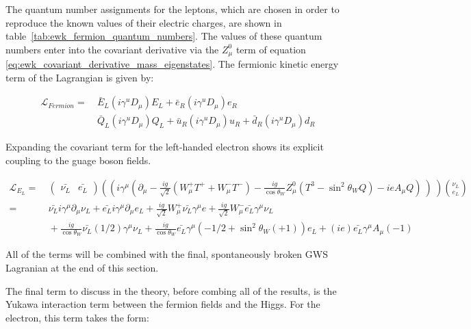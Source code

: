 \noindent The quantum number assignments for the leptons, which are
chosen in order to reproduce the known values of their electric
charges, are shown in table~\ref{tab:ewk_fermion_quantum_numbers}.
The values  of these quantum numbers enter into the covariant
derivative via the  $Z_{\mu}^{0}$ term of equation
\ref{eq:ewk_covariant_derivative_mass_eigenstates}.  The fermionic
kinetic energy term of the Lagrangian is given by:

\begin{equation}\label{eq:ewk_fermionic_lagrangian_term}
\begin{aligned}
\mathcal{L}_{Fermion} =&~ \bar{E}_{L}(i\gamma^{u}D_{\mu})E_{L} +
\bar{e}_{R}(i\gamma^{u}D_{\mu})e_{R} \\
&~ \bar{Q}_{L}(i\gamma^{u}D_{\mu})Q_{L} +
\bar{u}_{R}(i\gamma^{u}D_{\mu})u_{R} +
\bar{d}_{R}(i\gamma^{u}D_{\mu})d_{R}
\end{aligned}
\end{equation} 

\noindent Expanding the covariant term for the left-handed electron
shows its explicit coupling to the guage boson fields. 

\begin{equation}\label{eq:ewk_eLeft_lagrangian_term}
\begin{aligned}
\mathcal{L}_{E_{L}} =&~ 
\begin{pmatrix}
  \bar{\nu_{L}} & \bar{e_{L}} 
\end{pmatrix}
\left( (i\gamma^{\mu}(\partial_{\mu} -
  \frac{ig}{\sqrt{2}}(W_{\mu}^{+}T^{+} + W_{\mu}^{-}T^{-}) -
  \frac{ig}{\cos{\theta_{W}}}Z_{\mu}^{0}(T^{3}-\sin^{2}{\theta_{W}}Q)
  - ieA_{\mu}Q)~)~\right)\binom{\nu_{L}}{e_{L}} \\
=&~\bar{\nu_{L}}i\gamma^{\mu}\partial_{\mu}\nu_{L} +
\bar{e_{L}}i\gamma^{\mu}\partial_{\mu}e_{L}
+\frac{ig}{\sqrt{2}}W_{\mu}^{+}\bar{\nu_{L}}\gamma^{\mu}e +
\frac{ig}{\sqrt{2}}W_{\mu}^{-}\bar{e_{L}}\gamma^{\mu}\nu_{L} \\
&~+\frac{ig}{\cos{\theta_{W}}}\bar{\nu_{L}}(1/2)\gamma^{\mu}\nu_{L} +
\frac{ig}{\cos{\theta_{W}}}\bar{e_{L}}\gamma^{\mu}(-1/2 +
\sin^{2}{\theta_{W}}(+1))e_{L} + (ie)\bar{e_{L}}\gamma^{\mu}A_{\mu}(-1)
\end{aligned}
\end{equation}

\noindent All of the terms will be combined with the final,
spontaneously broken GWS Lagranian at the end of this section.  

\par The final term to discuss in the theory, before combing all of
the results, is the Yukawa interaction term between the fermion fields
and the Higgs.  For the electron, this term takes the form:

